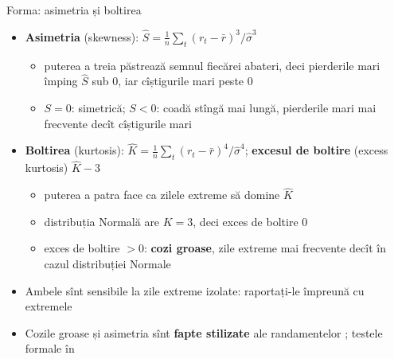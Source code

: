 \begin{frame}{Forma: asimetria și boltirea}
\itemsize{\small}
\begin{itemize}
    \item \textbf{Asimetria} (skewness): $\hat S = \frac1n \sum_t (r_t - \bar r)^3 / \hat\sigma^3$
    \begin{itemize}
        \item puterea a treia păstrează semnul fiecărei abateri, deci pierderile mari împing $\hat S$ sub 0, iar cîștigurile mari peste 0
        \item $S = 0$: simetrică; $S < 0$: coadă stîngă mai lungă, pierderile mari mai frecvente decît cîștigurile mari
    \end{itemize}
    \item \textbf{Boltirea} (kurtosis): $\hat K = \frac1n \sum_t (r_t - \bar r)^4 / \hat\sigma^4$; \textbf{excesul de boltire} (excess kurtosis) $\hat K - 3$
    \begin{itemize}
        \item puterea a patra face ca zilele extreme să domine $\hat K$
        \item distribuția Normală are $K = 3$, deci exces de boltire 0
        \item exces de boltire $> 0$: \textbf{cozi groase}, zile extreme mai frecvente decît în cazul distribuției Normale
    \end{itemize}
    \item Ambele sînt sensibile la zile extreme izolate: raportați-le împreună cu extremele
    \item Cozile groase și asimetria sînt \textbf{fapte stilizate} ale randamentelor ; testele formale în 
\end{itemize}
\end{frame}

